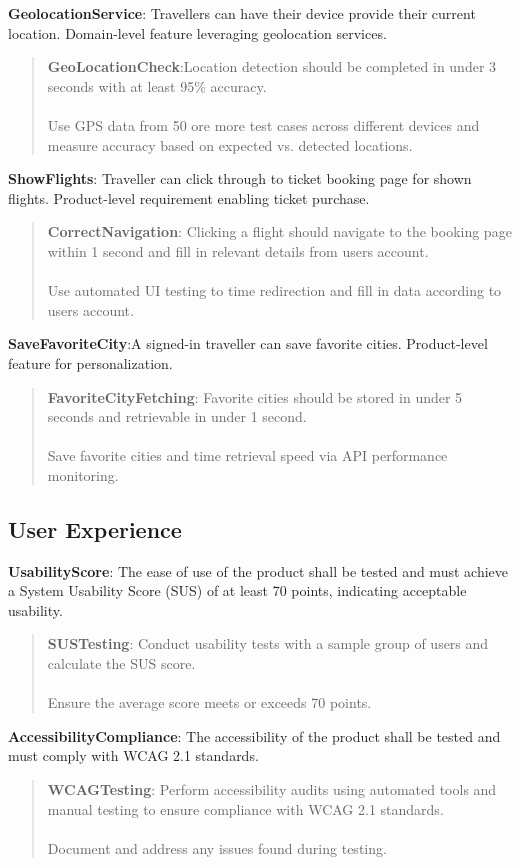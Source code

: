 \textbf{GeolocationService}: Travellers can have their device provide their current location. Domain-level feature leveraging geolocation services.
\begin{quote}
    \textbf{GeoLocationCheck}:Location detection should be completed in under 3 seconds with at least 95\% accuracy.\\ \\
    Use GPS data from 50 ore more test cases across different devices and measure accuracy based on expected vs. detected locations.
\end{quote}
\textbf{ShowFlights}: Traveller can click through to ticket booking page for shown flights. Product-level requirement enabling ticket purchase.
    \begin{quote}
        \textbf{CorrectNavigation}: Clicking a flight should navigate to the booking page within 1 second and fill in relevant details from users account. \\ \\
        Use automated UI testing to time redirection and fill in data according to users account.
    \end{quote}
\textbf{SaveFavoriteCity}:A signed-in traveller can save favorite cities. Product-level feature for personalization.
\begin{quote}
    \textbf{FavoriteCityFetching}: Favorite cities should be stored in under 5 seconds and retrievable in under 1 second. \\ \\
    Save favorite cities and time retrieval speed via API performance monitoring.
\end{quote}

\subsection{User Experience}
\textbf{UsabilityScore}: The ease of use of the product shall be tested and must achieve a System Usability Score (SUS) of at least 70 points, indicating acceptable usability.
\begin{quote}
    \textbf{SUSTesting}: Conduct usability tests with a sample group of users and calculate the SUS score. \\ \\
    Ensure the average score meets or exceeds 70 points.
\end{quote}

\textbf{AccessibilityCompliance}: The accessibility of the product shall be tested and must comply with WCAG 2.1 standards.
\begin{quote}
    \textbf{WCAGTesting}: Perform accessibility audits using automated tools and manual testing to ensure compliance with WCAG 2.1 standards. \\ \\
    Document and address any issues found during testing.
\end{quote}

